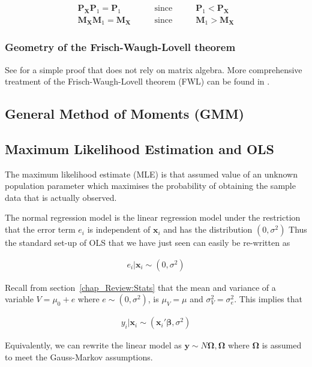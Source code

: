\begin{eqnarray}
\boldsymbol{P_{X}}\boldsymbol{P}_{1}=\boldsymbol{P}_{1} \qquad &\text{since}& \qquad \boldsymbol{P}_{1}<\boldsymbol{P_{X}}\\
\boldsymbol{M_{X}}\boldsymbol{M}_{1}=\boldsymbol{M_{X}} \qquad &\text{since}& \qquad \boldsymbol{M}_{1}>\boldsymbol{M_{X}}
\end{eqnarray}


\subsubsection{Geometry of the Frisch-Waugh-Lovell theorem}
See \citet{Lovell2008} for a simple proof that does not rely on matrix algebra. More comprehensive treatment of the Frisch-Waugh-Lovell theorem (FWL) can be found in \citet{Davidson2004}.

\subsection{General Method of Moments (GMM)}

\subsection{Maximum Likelihood Estimation and OLS}
The maximum likelihood estimate (MLE) is that assumed value of an unknown population parameter which maximises the probability of obtaining the sample data that is actually observed.

The normal regression model is the linear regression model under the restriction that the error term $e_{i}$ is independent of $\boldsymbol{x}_{i}$ and has the distribution $(0, \sigma^{2})$ Thus the standard set-up of OLS that we have just seen can easily be re-written as

\begin{eqnarray}
e_{i} | \boldsymbol{x}_{i} \sim (0, \sigma^{2})
\end{eqnarray}

Recall from section~\ref{chap_Review:Stats} that the mean and variance of a variable $V = \mu_{0} + e$ where $e \sim (0,\sigma^{2})$, is $\mu_{V} = \mu$ and $\sigma^{2}_{V}=\sigma^{2}_{e}$. This implies that

\begin{eqnarray}
y_{i} | \boldsymbol{x}_{i} \sim (\boldsymbol{x}_{i}'\boldsymbol{\beta}, \sigma^{2})
\end{eqnarray}

Equivalently, we can rewrite the linear model as $\boldsymbol{y} \sim N{\boldsymbol{\Omega}, \boldsymbol{\Omega}}$ where $\boldsymbol{\Omega}$ is assumed to meet the Gauss-Markov assumptions.

